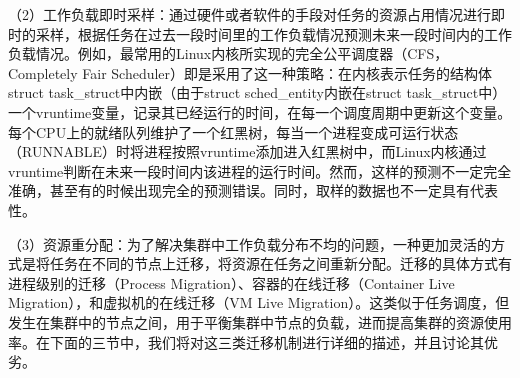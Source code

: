 （2）工作负载即时采样：通过硬件或者软件的手段对任务的资源占用情况进行即时的采样，根据任务在过去一段时间里的工作负载情况预测未来一段时间内的工作负载情况。例如，最常用的Linux内核所实现的完全公平调度器（CFS，Completely Fair Scheduler）即是采用了这一种策略：在内核表示任务的结构体struct task\_struct中内嵌（由于struct sched\_entity内嵌在struct task\_struct中）一个vruntime变量，记录其已经运行的时间，在每一个调度周期中更新这个变量。每个CPU上的就绪队列维护了一个红黑树，每当一个进程变成可运行状态（RUNNABLE）时将进程按照vruntime添加进入红黑树中，而Linux内核通过vruntime判断在未来一段时间内该进程的运行时间。然而，这样的预测不一定完全准确，甚至有的时候出现完全的预测错误。同时，取样的数据也不一定具有代表性。

\label{chap:reallocation}
（3）资源重分配：为了解决集群中工作负载分布不均的问题，一种更加灵活的方式是将任务在不同的节点上迁移，将资源在任务之间重新分配。迁移的具体方式有进程级别的迁移（Process Migration）、容器的在线迁移（Container Live Migration），和虚拟机的在线迁移（VM Live Migration）。这类似于任务调度，但发生在集群中的节点之间，用于平衡集群中节点的负载，进而提高集群的资源使用率。在下面的三节中，我们将对这三类迁移机制进行详细的描述，并且讨论其优劣。
